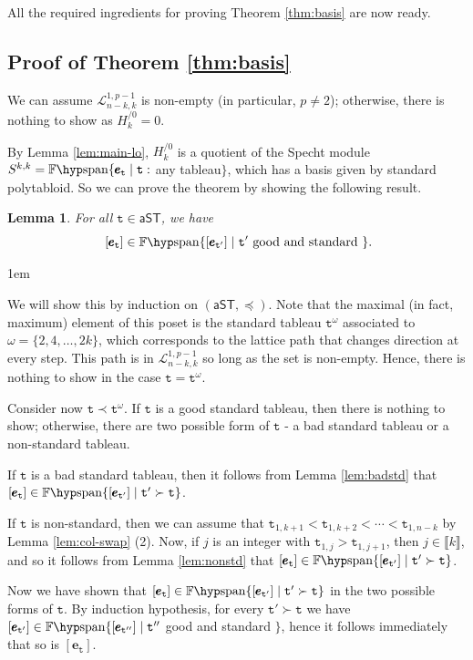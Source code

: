 \documentclass[a4paper]{amsart}
\makeatletter
\numberwithin{equation}{subsection}
\newtheorem{lemma}[theorem]{Lemma}
\theoremstyle{definition}
\newcommand{\interval}[1]{\llbracket #1 \rrbracket}
\newcommand{\bfe}{\pmb{e}}
\newcommand{\tbx}{\mathtt{t}}
\newcommand{\aST}{\mathsf{aST}}
\newcommand{\Fspan}{\mathbb{F}\hyp\mathrm{span}}
\renewenvironment{proof}[1][\proofname]{\par
	\pushQED{\qed}%
	\normalfont \topsep0\p@\@plus6\p@ \labelsep1em\relax
	\trivlist
	\item[\hskip\labelsep\bfseries #1]\ignorespaces
	\mbox{}%
}{
	\popQED\endtrivlist\@endpefalse
}
\numberwithin{equation}{subsection}
\makeatother
\begin{document}
All the required ingredients for proving Theorem \ref{thm:basis} are now ready.

\subsection{Proof of Theorem \ref{thm:basis}}\label{subsec:basisproof}
We can assume $\mathcal{L}_{n-k,k}^{1,p-1}$ is non-empty (in particular, $p\neq 2$); otherwise, there is nothing to show as $H_k^{/0}=0$.

By Lemma \ref{lem:main-lo}, $H_k^{/0}$ is a quotient of the Specht module $S^{k,k} = \Fspan\{\bfe_\tbx\mid \tbx:$ any tableau$\}$, which has a basis given by standard polytabloid.  So we can prove the theorem by showing the following result.

\begin{lemma}
For all $\tbx\in \aST$, we have
\[
\ [\bfe_{\tbx}] \in  \Fspan\{[\bfe_{\tbx'}]\mid \tbx'\text{ good and standard }\}.
\]
\end{lemma}
\begin{proof}
We will show this by induction on $(\aST,\preceq)$.
Note that the maximal (in fact, maximum) element of this poset is the standard tableau $\tbx^\omega$ associated to $\omega=\{2, 4, \ldots,2k\}$, which corresponds to the lattice path that changes direction at every step.
This path is in $\mathcal{L}_{n-k,k}^{1,p-1}$ so long as the set is non-empty.
Hence, there is nothing to show in the case $\tbx=\tbx^\omega$.

Consider now $\tbx\prec\tbx^\omega$.
If $\tbx$ is a good standard tableau, then there is nothing to show; otherwise, there are two possible form of $\tbx$ - a bad standard tableau or a non-standard tableau.

If $\tbx$ is a bad standard tableau, then it follows from Lemma \ref{lem:badstd} that $[\bfe_\tbx]\in \Fspan\{[\bfe_{\tbx'}] \mid \tbx'\succ \tbx\}$.

If $\tbx$ is non-standard, then 
we can assume that $\tbx_{1,k+1}< \tbx_{1,k+2}<\cdots <\tbx_{1,n-k}$ by Lemma \ref{lem:col-swap} (2).
Now, if $j$ is an integer with $\tbx_{1,j}>\tbx_{1,j+1}$, then $j\in\interval{k}$, and so it follows from Lemma \ref{lem:nonstd} that $[\bfe_\tbx]\in \Fspan\{[\bfe_{\tbx'}]\mid \tbx'\succ\tbx\}$.

Now we have shown that $[\bfe_\tbx]\in \Fspan\{[\bfe_{\tbx'}]\mid \tbx'\succ\tbx\}$ in the two possible forms of $\tbx$.
By induction hypothesis, for every $\tbx'\succ\tbx$ we have $[\bfe_{\tbx'}]\in \Fspan\{[\bfe_{\tbx''}]\mid \tbx''$ good and standard $\}$, hence it follows immediately that so is $[\bfe_\tbx]$.
\end{proof}
\end{document}
